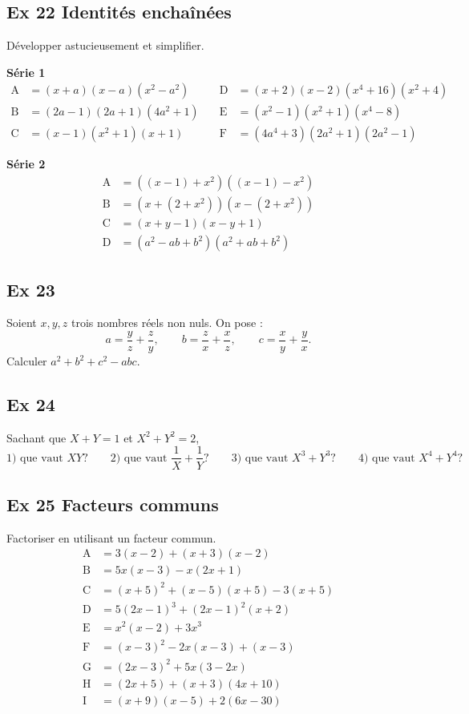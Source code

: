 \documentclass[a4paper,11pt]{article}
\begin{document}
\subsection*{Ex 22 \; Identités enchaînées}
Développer astucieusement et simplifier.

\textbf{Série 1}
\[
\begin{aligned}
\mathrm{A}&=(x+a)(x-a)(x^{2}-a^{2}) &\quad \mathrm{D}&=(x+2)(x-2)(x^{4}+16)(x^{2}+4)\\
\mathrm{B}&=(2a-1)(2a+1)(4a^{2}+1) &\quad \mathrm{E}&=(x^{2}-1)(x^{2}+1)(x^{4}-8)\\
\mathrm{C}&=(x-1)(x^{2}+1)(x+1) &\quad \mathrm{F}&=(4a^{4}+3)(2a^{2}+1)(2a^{2}-1)
\end{aligned}
\]

\textbf{Série 2}
\[
\begin{aligned}
\mathrm{A}&=((x-1)+x^{2})((x-1)-x^{2})\\
\mathrm{B}&=(x+(2+x^{2}))(x-(2+x^{2}))\\
\mathrm{C}&=(x+y-1)(x-y+1)\\
\mathrm{D}&=(a^{2}-ab+b^{2})(a^{2}+ab+b^{2})
\end{aligned}
\]


\subsection*{Ex 23}
Soient \(x,y,z\) trois nombres réels non nuls. On pose :
\[
a=\frac{y}{z}+\frac{z}{y},\qquad
b=\frac{z}{x}+\frac{x}{z},\qquad
c=\frac{x}{y}+\frac{y}{x}.
\]
Calculer \(a^{2}+b^{2}+c^{2}-abc\).


\subsection*{Ex 24}
Sachant que \(X+Y=1\) et \(X^{2}+Y^{2}=2\),
\[
\text{1) que vaut }XY?\qquad
\text{2) que vaut } \frac{1}{X}+\frac{1}{Y} ?\qquad
\text{3) que vaut }X^{3}+Y^{3}?\qquad
\text{4) que vaut }X^{4}+Y^{4}?
\]


\subsection*{Ex 25 \; Facteurs communs}
Factoriser en utilisant un facteur commun.
\[
\begin{aligned}
\mathrm{A}&=3(x-2)+(x+3)(x-2)\\
\mathrm{B}&=5x(x-3)-x(2x+1)\\
\mathrm{C}&=(x+5)^{2}+(x-5)(x+5)-3(x+5)\\
\mathrm{D}&=5(2x-1)^{3}+(2x-1)^{2}(x+2)\\
\mathrm{E}&=x^{2}(x-2)+3x^{3}\\
\mathrm{F}&=(x-3)^{2}-2x(x-3)+(x-3)\\
\mathrm{G}&=(2x-3)^{2}+5x(3-2x)\\
\mathrm{H}&=(2x+5)+(x+3)(4x+10)\\
\mathrm{I}&=(x+9)(x-5)+2(6x-30)
\end{aligned}
\]
\end{document}
